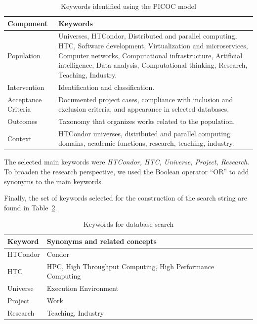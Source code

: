 \begin{table}[ht]
    \renewcommand{\arraystretch}{1.3}
    \centering
	\caption{Keywords identified using the PICOC model}
    \begin{tabular}{p{1.8cm}p{5.0cm}}
        \hline
        \textbf{Component} & \textbf{Keywords} \\
        \hline
        Population & Universes, HTCondor, Distributed and parallel computing, HTC, Software development, Virtualization and microservices, Computer networks, Computational infrastructure, Artificial intelligence, Data analysis, Computational thinking, Research, Teaching, Industry. \\
        Intervention & Identification and classification. \\
        Acceptance Criteria & Documented project cases, compliance with inclusion and exclusion criteria, and appearance in selected databases. \\
        Outcomes & Taxonomy that organizes works related to the population. \\
        Context & HTCondor universes, distributed and parallel computing domains, academic functions, research, teaching, industry. \\
        \hline
    \end{tabular}
	\label{table:picoc_keywords}
\end{table}

The selected main keywords were \textit{HTCondor, HTC, Universe, Project, Research}. To broaden the research perspective, we used the Boolean operator ``OR'' to add synonyms to the main keywords.

Finally, the set of keywords selected for the construction of the search string are found in Table~\ref{table:database_search_keywords}.


\begin{table}[ht]
    \renewcommand{\arraystretch}{1.3}
    \centering
	\caption{Keywords for database search}
	\begin{tabular}{p{1.6cm}p{5.2cm}}
        \hline
		\textbf{Keyword}  & \textbf{Synonyms and related concepts} \\
		\hline
        HTCondor & Condor                                                     \\
        HTC      & HPC, High Throughput Computing, High Performance Computing \\
        Universe & Execution Environment                                      \\
        Project  & Work                                                       \\
        Research & Teaching, Industry                                         \\
        \hline
    \end{tabular}
	\label{table:database_search_keywords}
\end{table}

